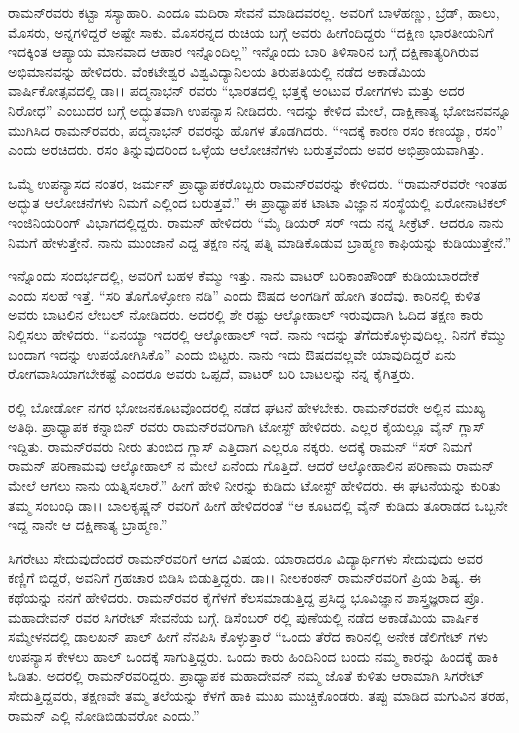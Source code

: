 ರಾಮನ್‍ರವರು ಕಟ್ಟಾ ಸಸ್ಯಾಹಾರಿ. ಎಂದೂ ಮದಿರಾ ಸೇವನೆ ಮಾಡಿದವರಲ್ಲ. ಅವರಿಗೆ ಬಾಳೆಹಣ್ಣು, ಬ್ರೆಡ್, ಹಾಲು, ಮೊಸರು, ಅನ್ನಗಳಿದ್ದರೆ ಅಷ್ಟೇ ಸಾಕು. ಮೊಸರನ್ನದ ರುಚಿಯ ಬಗ್ಗೆ ಅವರು ಹೀಗೆಂದಿದ್ದರು “ದಕ್ಷಿಣ ಭಾರತೀಯನಿಗೆ ಇದಕ್ಕಿಂತ ಆಪ್ಯಾಯ ಮಾನವಾದ ಆಹಾರ ಇನ್ನೊಂದಿಲ್ಲ” ಇನ್ನೊಂದು ಬಾರಿ ತಿಳಿಸಾರಿನ ಬಗ್ಗೆ ದಕ್ಷಿಣಾತ್ಯರಿಗಿರುವ ಅಭಿಮಾನವನ್ನು ಹೇಳಿದರು. ವೆಂಕಟೇಶ್ವರ ವಿಶ್ವವಿದ್ಯಾನಿಲಯ ತಿರುಪತಿಯಲ್ಲಿ ನಡೆದ ಅಕಾಡೆಮಿಯ ವಾರ್ಷಿಕೋತ್ಸವದಲ್ಲಿ ಡಾ।। ಪದ್ಮನಾಭನ್ ರವರು “ಭಾರತದಲ್ಲಿ ಭತ್ತಕ್ಕೆ ಅಂಟುವ ರೋಗಗಳು ಮತ್ತು ಅದರ ನಿರೋಧ” \textit{} ಎಂಬುದರ ಬಗ್ಗೆ ಅದ್ಭುತವಾಗಿ ಉಪನ್ಯಾಸ ನೀಡಿದರು. ಇದನ್ನು ಕೇಳಿದ ಮೇಲೆ, ದಾಕ್ಷಿಣಾತ್ಯ ಭೋಜನವನ್ನೂ ಮುಗಿಸಿದ ರಾಮನ್‍ರವರು, ಪದ್ಮನಾಭನ್ ರವರನ್ನು ಹೊಗಳ ತೊಡಗಿದರು. “ಇದಕ್ಕೆ ಕಾರಣ ರಸಂ ಕಣಯ್ಯಾ, ರಸಂ” ಎಂದು ಅರಚಿದರು. ರಸಂ ತಿನ್ನುವುದರಿಂದ ಒಳ್ಳೆಯ ಆಲೋಚನೆಗಳು ಬರುತ್ತವೆಂದು ಅವರ ಅಭಿಪ್ರಾಯವಾಗಿತ್ತು.

ಒಮ್ಮೆ ಉಪನ್ಯಾಸದ ನಂತರ, ಜರ್ಮನ್ ಪ್ರಾಧ್ಯಾಪಕರೊಬ್ಬರು ರಾಮನ್‍ರವರನ್ನು ಕೇಳಿದರು. “ರಾಮನ್‍ರವರೇ ಇಂತಹ ಅದ್ಭುತ ಆಲೋಚನೆಗಳು ನಿಮಗೆ ಎಲ್ಲಿಂದ ಬರುತ್ತವೆ.” ಈ ಪ್ರಾಧ್ಯಾಪಕ ಟಾಟಾ ವಿಜ್ಞಾನ ಸಂಸ್ಥೆಯಲ್ಲಿ ಏರೋನಾಟಿಕಲ್ ಇಂಜಿನಿಯರಿಂಗ್ ವಿಭಾಗದಲ್ಲಿದ್ದರು. ರಾಮನ್ ಹೇಳಿದರು “ಮೈ ಡಿಯರ್ ಸರ್ ಇದು ನನ್ನ ಸೀಕ್ರೆಟ್. ಆದರೂ ನಾನು ನಿಮಗೆ ಹೇಳುತ್ತೇನೆ. ನಾನು ಮುಂಜಾನೆ ಎದ್ದ ತಕ್ಷಣ ನನ್ನ ಪತ್ನಿ ಮಾಡಿಕೊಡುವ ಬ್ರಾಹ್ಮಣ ಕಾಫಿಯನ್ನು ಕುಡಿಯುತ್ತೇನೆ.” 

ಇನ್ನೊಂದು ಸಂದರ್ಭದಲ್ಲಿ, ಅವರಿಗೆ ಬಹಳ ಕೆಮ್ಮು ಇತ್ತು. ನಾನು ವಾಟರ್ ಬರಿಕಾಂಪೌಂಡ್ ಕುಡಿಯಬಾರದೇಕೆ ಎಂದು ಸಲಹೆ ಇತ್ತೆ. “ಸರಿ ತೊಗೊಳ್ಳೋಣ ನಡಿ” ಎಂದು ಔಷದ ಅಂಗಡಿಗೆ ಹೋಗಿ ತಂದೆವು. ಕಾರಿನಲ್ಲಿ ಕುಳಿತ ಅವರು ಬಾಟಲಿನ ಲೇಬಲ್ ನೋಡಿದರು. ಅದರಲ್ಲಿ ಶೇ  ರಷ್ಟು ಆಲ್ಕೋಹಾಲ್ ಇರುವುದಾಗಿ ಓದಿದ ತಕ್ಷಣ ಕಾರು ನಿಲ್ಲಿಸಲು ಹೇಳಿದರು. “ಏನಯ್ಯಾ ಇದರಲ್ಲಿ ಆಲ್ಕೋಹಾಲ್ ಇದೆ. ನಾನು ಇದನ್ನು ತೆಗೆದುಕೊಳ್ಳುವುದಿಲ್ಲ. ನಿನಗೆ ಕೆಮ್ಮು ಬಂದಾಗ ಇದನ್ನು ಉಪಯೋಗಿಸಿಕೊ” ಎಂದು ಬಿಟ್ಟರು. ನಾನು ಇದು ಔಷದವಲ್ಲವೇ ಯಾವುದಿದ್ದರೆ ಏನು ರೋಗವಾಸಿಯಾಗಬೇಕಷ್ಟೆ ಎಂದರೂ ಅವರು ಒಪ್ಪದೆ, ವಾಟರ್ ಬರಿ ಬಾಟಲನ್ನು ನನ್ನ ಕೈಗಿತ್ತರು.

ರಲ್ಲಿ ಬೋರ್ಡೋ ನಗರ ಭೋಜನಕೂಟವೊಂದರಲ್ಲಿ ನಡೆದ ಘಟನೆ ಹೇಳಬೇಕು. ರಾಮನ್‍ರವರೇ ಅಲ್ಲಿನ ಮುಖ್ಯ ಅತಿಥಿ. ಪ್ರಾಧ್ಯಾಪಕ ಕನ್ನಾಬಿನ್ ರವರು ರಾಮನ್‍ರವರಿಗಾಗಿ ಟೋಸ್ಟ್ ಹೇಳಿದರು. ಎಲ್ಲರ ಕೈಯಲ್ಲೂ ವೈನ್ ಗ್ಲಾಸ್ ಇದ್ದಿತು. ರಾಮನ್‍ರವರು ನೀರು ತುಂಬಿದ ಗ್ಲಾಸ್ ಎತ್ತಿದಾಗ ಎಲ್ಲರೂ ನಕ್ಕರು. ಅದಕ್ಕೆ ರಾಮನ್ “ಸರ್ ನಿಮಗೆ ರಾಮನ್ ಪರಿಣಾಮವು ಆಲ್ಕೋಹಾಲ್ ನ ಮೇಲೆ ಏನೆಂದು ಗೊತ್ತಿದೆ. ಆದರೆ ಆಲ್ಕೋಹಾಲಿನ ಪರಿಣಾಮ ರಾಮನ್ ಮೇಲೆ ಆಗಲು ನಾನು ಯತ್ನಿಸಲಾರೆ.” ಹೀಗೆ ಹೇಳಿ ನೀರನ್ನು ಕುಡಿದು ಟೋಸ್ಟ್ ಹೇಳಿದರು. ಈ ಘಟನೆಯನ್ನು ಕುರಿತು ತಮ್ಮ ಸಂಬಂಧಿ ಡಾ।। ಬಾಲಕೃಷ್ಣನ್ ರವರಿಗೆ ಹೀಗೆ ಹೇಳಿದರಂತೆ “ಆ ಕೂಟದಲ್ಲಿ ವೈನ್ ಕುಡಿದು ತೂರಾಡದ ಒಬ್ಬನೇ ಇದ್ದ ನಾನೇ ಆ ದಕ್ಷಿಣಾತ್ಯ ಬ್ರಾಹ್ಮಣ.”

ಸಿಗರೇಟು ಸೇದುವುದೆಂದರೆ ರಾಮನ್‍ರವರಿಗೆ ಆಗದ ವಿಷಯ. ಯಾರಾದರೂ ವಿದ್ಯಾರ್ಥಿಗಳು ಸೇದುವುದು ಅವರ ಕಣ್ಣಿಗೆ ಬಿದ್ದರೆ, ಅವನಿಗೆ ಗ್ರಹಚಾರ ಬಿಡಿಸಿ ಬಿಡುತ್ತಿದ್ದರು. ಡಾ।। ನೀಲಕಂಠನ್ ರಾಮನ್‍ರವರಿಗೆ ಪ್ರಿಯ ಶಿಷ್ಯ. ಈ ಕಥೆಯನ್ನು ನನಗೆ ಹೇಳಿದರು. ರಾಮನ್‍ರವರ ಕೈಗೆಳಗೆ ಕೆಲಸಮಾಡುತ್ತಿದ್ದ ಪ್ರಸಿದ್ಧ ಭೂವಿಜ್ಞಾನ ಶಾಸ್ತ್ರಜ್ಞರಾದ ಪ್ರೊ. ಮಹಾದೇವನ್ ರವರ ಸಿಗರೇಟ್ ಸೇವನೆಯ ಬಗ್ಗೆ. ಡಿಸೆಂಬರ್ ರಲ್ಲಿ ಪುಣೆಯಲ್ಲಿ ನಡೆದ ಅಕಾಡೆಮಿಯ ವಾರ್ಷಿಕ ಸಮ್ಮೇಳನದಲ್ಲಿ ಡಾಲಖನ್ ಪಾಲ್ ಹೀಗೆ ನೆನಪಿಸಿ ಕೊಳ್ಳುತ್ತಾರೆ “ಒಂದು ತೆರೆದ ಕಾರಿನಲ್ಲಿ ಅನೇಕ ಡೆಲಿಗೇಟ್ ಗಳು ಉಪನ್ಯಾಸ ಕೇಳಲು ಹಾಲ್ ಒಂದಕ್ಕೆ ಸಾಗುತ್ತಿದ್ದರು. ಒಂದು ಕಾರು ಹಿಂದಿನಿಂದ ಬಂದು ನಮ್ಮ ಕಾರನ್ನು ಹಿಂದಕ್ಕೆ ಹಾಕಿ ಓಡಿತು. ಅದರಲ್ಲಿ ರಾಮನ್‍ರವರಿದ್ದರು. ಪ್ರಾಧ್ಯಾಪಕ ಮಹಾದೇವನ್ ನಮ್ಮ ಜೊತೆ ಕುಳಿತು ಆರಾಮಾಗಿ ಸಿಗರೇಟ್ ಸೇದುತ್ತಿದ್ದವರು, ತಕ್ಷಣವೇ ತಮ್ಮ ತಲೆಯನ್ನು ಕೆಳಗೆ ಹಾಕಿ ಮುಖ ಮುಚ್ಚಿಕೊಂಡರು. ತಪ್ಪು ಮಾಡಿದ ಮಗುವಿನ ತರಹ, ರಾಮನ್ ಎಲ್ಲಿ ನೋಡಿಬಿಡುವರೋ ಎಂದು.”

